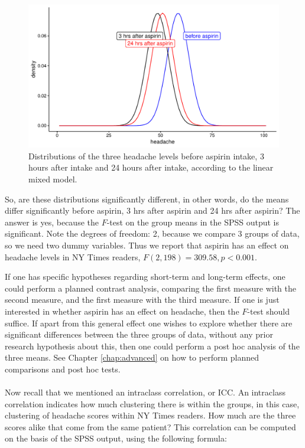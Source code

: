 \documentclass[]{book}\usepackage[]{graphicx}\usepackage[]{color}
\makeatletter
\def\maxwidth{ %
  \ifdim\Gin@nat@width>\linewidth
    \linewidth
  \else
    \Gin@nat@width
  \fi
}
\newenvironment{knitrout}{}{} %
\makeatother
\begin{document}
\begin{knitrout}
\color{fgcolor}\begin{figure}

{\centering \includegraphics[width=\maxwidth]{figure/analysispremidpost3-1} 

}

\caption[Distributions of the three headache levels before aspirin intake, 3 hours after intake and 24 hours after intake, according to the linear mixed model]{Distributions of the three headache levels before aspirin intake, 3 hours after intake and 24 hours after intake, according to the linear mixed model.}\label{fig:analysispremidpost3}
\end{figure}


\end{knitrout}



So, are these distributions significantly different, in other words, do the means differ significantly before aspirin, 3 hrs after aspirin and 24 hrs after aspirin? The answer is yes, because the $F$-test on the group means in the SPSS output is significant. Note the degrees of freedom: 2, because we compare 3 groups of data, so we need two dummy variables. Thus we report that aspirin has an effect on headache levels in NY Times readers, $F(2, 198)=309.58, p<0.001$.

If one has specific hypotheses regarding short-term and long-term effects, one could perform a planned contrast analysis, comparing the first measure with the second measure, and the first measure with the third measure. If one is just interested in whether aspirin has an effect on headache, then the $F$-test should suffice. If apart from this general effect one wishes to explore whether there are significant differences between the three groups of data, without any prior research hypothesis about this, then one could perform a post hoc analysis of the three means. See Chapter \ref{chap:advanced} on how to perform planned comparisons and post hoc tests.
\\
\\
Now recall that we mentioned an intraclass correlation, or ICC. An intraclass correlation indicates how much clustering there is within the groups, in this case, clustering of headache scores within NY Times readers. How much are the three scores alike that come from the same patient? This correlation can be computed on the basis of the SPSS output, using the following formula:
\end{document}

